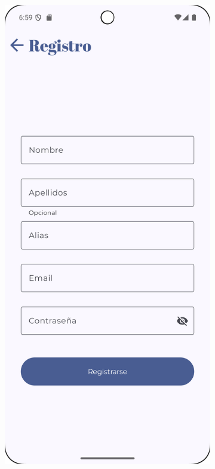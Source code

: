\begin{figure}[H]
    \centering

    \begin{subfigure}[b]{0.3\textwidth}
      \includegraphics[width=\textwidth]{./img/manual/pinche_register.png}

\end{subfigure}
\end{figure}
